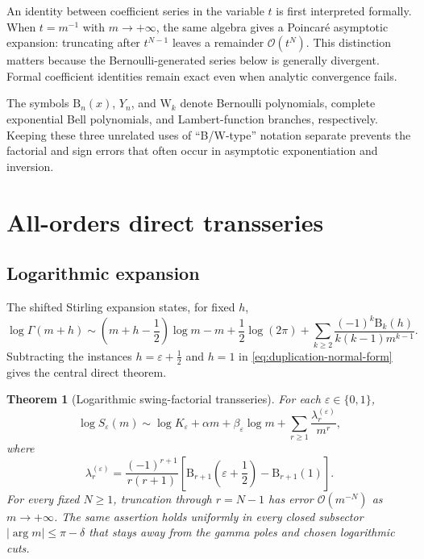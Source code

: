 \documentclass[11pt,a4paper]{article}
\theoremstyle{clean}
\newtheorem{theorem}{Theorem}[section]
\theoremstyle{definition}
\newcommand{\eps}{\varepsilon}
\newcommand{\al}{\alpha}
\newcommand{\be}{\beta}
\newcommand{\B}{\mathrm B}
\newcommand{\W}{\mathrm W}
\newcommand{\OO}{\mathcal O}
\begin{document}
An identity between coefficient series in the variable \(t\) is first interpreted formally.  When \(t=m^{-1}\) with \(m\to+\infty\), the same algebra gives a Poincar\'e asymptotic expansion: truncating after \(t^{N-1}\) leaves a remainder \(\OO(t^N)\).  This distinction matters because the Bernoulli-generated series below is generally divergent.  Formal coefficient identities remain exact even when analytic convergence fails.

\begin{auditbox}
The symbols \(\B_n(x)\), \(Y_n\), and \(\W_k\) denote Bernoulli polynomials, complete exponential Bell polynomials, and Lambert-function branches, respectively.  Keeping these three unrelated uses of ``B/W-type'' notation separate prevents the factorial and sign errors that often occur in asymptotic exponentiation and inversion.
\end{auditbox}

\section{All-orders direct transseries}
\label{sec:direct}

\subsection{Logarithmic expansion}

The shifted Stirling expansion states, for fixed \(h\),
\begin{equation}
 \log\Gamma(m+h)
 \sim \left(m+h-\frac12\right)\log m-m+\frac12\log(2\pi)
 +\sum_{k\ge2}\frac{(-1)^k\B_k(h)}{k(k-1)m^{k-1}}.
 \label{eq:shifted-Stirling}
\end{equation}
Subtracting the instances \(h=\eps+\tfrac12\) and \(h=1\) in
\cref{eq:duplication-normal-form} gives the central direct theorem.

\begin{theorem}[Logarithmic swing-factorial transseries]
\label{thm:log-direct}
For each \(\eps\in\{0,1\}\),
\begin{equation}
 \log S_\eps(m)
 \sim \log K_\eps+\al m+\be_\eps\log m
 +\sum_{r\ge1}\frac{\lambda_r^{(\eps)}}{m^r},
 \label{eq:log-direct}
\end{equation}
where
\begin{equation}
 \boxed{\displaystyle
 \lambda_r^{(\eps)}=
 \frac{(-1)^{r+1}}{r(r+1)}
 \left[
 \B_{r+1}\!\left(\eps+\frac12\right)-\B_{r+1}(1)
 \right].}
 \label{eq:lambda-general}
\end{equation}
For every fixed \(N\ge1\), truncation through \(r=N-1\) has error \(\OO(m^{-N})\) as \(m\to+\infty\).  The same assertion holds uniformly in every closed subsector \(|\arg m|\le\pi-\delta\) that stays away from the gamma poles and chosen logarithmic cuts.
\end{theorem}
\end{document}

